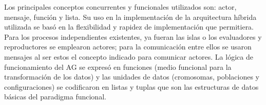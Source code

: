 Los principales conceptos concurrentes y funcionales utilizados son: actor, mensaje, función y lista. Su uso en la implementación de la arquitectura híbrida utilizada se basó en la flexibilidad y rapidez de implementación que permitiera. Para los procesos independientes existentes, ya fueran las islas o los evaluadores y reproductores se emplearon actores; para la comunicación entre ellos se usaron mensajes al ser estos el concepto indicado para comunicar actores. La lógica de funcionamiento del AG se expresó en funciones (medio funcional para la transformación de los datos) y las unidades de datos (cromosomas, poblaciones y configuraciones) se codificaron en listas y tuplas que son las estructuras de datos básicas del paradigma funcional.


